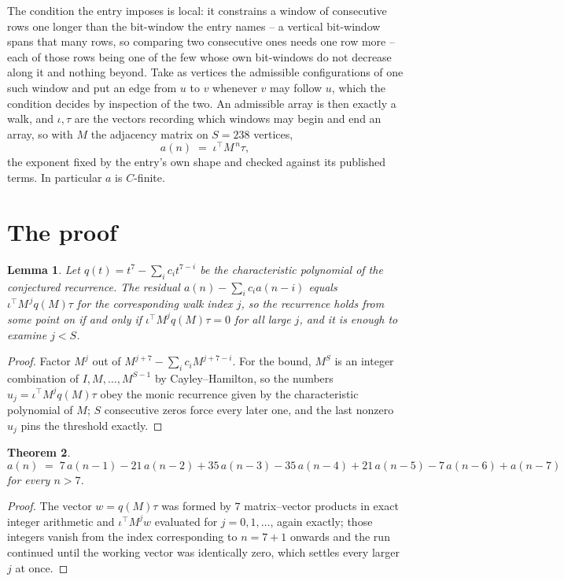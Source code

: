 \documentclass[11pt,a4paper]{article}
\theoremstyle{plain}
\newtheorem{theorem}{Theorem}
\newtheorem{lemma}[theorem]{Lemma}
\theoremstyle{definition}
\begin{document}
The condition the entry imposes is local: it constrains a window of consecutive rows one longer than the bit-window the entry names -- a vertical bit-window spans that many rows, so comparing two consecutive ones needs one row more -- each of those rows being one of the few whose own bit-windows do not decrease along it and nothing beyond. Take as vertices the admissible configurations of one such window and put an edge from $u$ to $v$ whenever $v$ may follow $u$, which the condition decides by inspection of the two.
An admissible array is then exactly a walk, and $\iota,\tau$ are the vectors recording which windows may begin and end an array, so with $M$ the adjacency matrix on $S=238$ vertices,
\[
a(n)\;=\;\iota^{\!\top}M^{\,n}\tau ,
\]
the exponent fixed by the entry's own shape and checked against its published terms. In
particular $a$ is $C$-finite.

\section{The proof}

\begin{lemma}\label{lem:crit}
Let $q(t)=t^{7}-\sum_i c_it^{7-i}$ be the characteristic polynomial of the
conjectured recurrence. The residual $a(n)-\sum_ic_ia(n-i)$ equals
$\iota^{\!\top}M^{\,j}q(M)\tau$ for the corresponding walk index $j$, so the recurrence
holds from some point on if and only if $\iota^{\!\top}M^{j}q(M)\tau=0$ for all large $j$,
and it is enough to examine $j<S$.
\end{lemma}

\begin{proof}
Factor $M^{j}$ out of $M^{j+7}-\sum_ic_iM^{j+7-i}$. For the bound, $M^{S}$
is an integer combination of $I,M,\dots,M^{S-1}$ by Cayley--Hamilton, so the numbers
$u_j=\iota^{\!\top}M^{j}q(M)\tau$ obey the monic recurrence given by the characteristic
polynomial of $M$; $S$ consecutive zeros force every later one, and the last nonzero $u_j$
pins the threshold exactly.
\end{proof}

\begin{theorem}
\[
a(n)\;=\;7\,a(n-1) - 21\,a(n-2) + 35\,a(n-3) - 35\,a(n-4) + 21\,a(n-5) - 7\,a(n-6) + a(n-7)
\]
for every $n>7$.
\end{theorem}

\begin{proof}
The vector $w=q(M)\tau$ was formed by $7$ matrix--vector products in exact integer
arithmetic and $\iota^{\!\top}M^{j}w$ evaluated for $j=0,1,\dots$, again exactly; those
integers vanish from the index corresponding to $n=7+1$ onwards and the run continued
until the working vector was identically zero, which settles every larger $j$ at once.
\end{proof}
\end{document}
